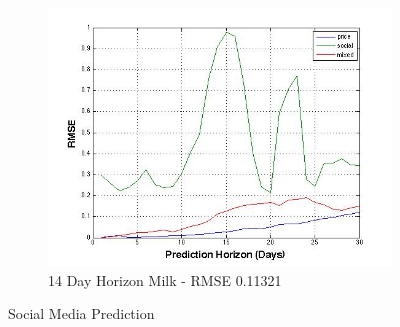 \begin{figure}
        \begin{subfigure}[b]{0.5\textwidth}
                \includegraphics[width=\textwidth]{img/model/results/result_milk}
                \caption{14 Day Horizon Milk - RMSE 0.11321  }
                \label{fig:tiger}
         \end{subfigure}%
         
        \caption{Social Media Prediction}\label{fig:final_res}
\end{figure}











